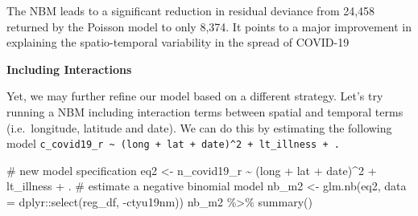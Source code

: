 \documentclass[
  letterpaper,
  DIV=11,
  numbers=noendperiod,
  oneside]{scrreprt}
\newenvironment{Shaded}{\begin{snugshade}}{\end{snugshade}}
\newcommand{\AttributeTok}[1]{\textcolor[rgb]{0.40,0.45,0.13}{#1}}
\newcommand{\CommentTok}[1]{\textcolor[rgb]{0.37,0.37,0.37}{#1}}
\newcommand{\DecValTok}[1]{\textcolor[rgb]{0.68,0.00,0.00}{#1}}
\newcommand{\FunctionTok}[1]{\textcolor[rgb]{0.28,0.35,0.67}{#1}}
\newcommand{\NormalTok}[1]{\textcolor[rgb]{0.00,0.23,0.31}{#1}}
\newcommand{\OtherTok}[1]{\textcolor[rgb]{0.00,0.23,0.31}{#1}}
\newcommand{\SpecialCharTok}[1]{\textcolor[rgb]{0.37,0.37,0.37}{#1}}
\begin{document}
The NBM leads to a significant reduction in residual deviance from
24,458 returned by the Poisson model to only 8,374. It points to a major
improvement in explaining the spatio-temporal variability in the spread
of COVID-19

\textbf{Including Interactions}

Yet, we may further refine our model based on a different strategy.
Let's try running a NBM including interaction terms between spatial and
temporal terms (i.e.~longitude, latitude and date). We can do this by
estimating the following model
\texttt{c\_covid19\_r\ \textasciitilde{}\ (long\ +\ lat\ +\ date)\^{}2\ +\ lt\_illness\ +\ .}

\begin{Shaded}
\begin{Highlighting}[]
\CommentTok{\# new model specification}
\NormalTok{eq2 }\OtherTok{\textless{}{-}}\NormalTok{ n\_covid19\_r }\SpecialCharTok{\textasciitilde{}}\NormalTok{ (long }\SpecialCharTok{+}\NormalTok{ lat }\SpecialCharTok{+}\NormalTok{ date)}\SpecialCharTok{\^{}}\DecValTok{2} \SpecialCharTok{+}\NormalTok{ lt\_illness }\SpecialCharTok{+}\NormalTok{ .}
\CommentTok{\# estimate a negative binomial model}
\NormalTok{nb\_m2 }\OtherTok{\textless{}{-}} \FunctionTok{glm.nb}\NormalTok{(eq2, }
       \AttributeTok{data =}\NormalTok{ dplyr}\SpecialCharTok{::}\FunctionTok{select}\NormalTok{(reg\_df, }\SpecialCharTok{{-}}\NormalTok{ctyu19nm))}
\NormalTok{nb\_m2 }\SpecialCharTok{\%\textgreater{}\%} \FunctionTok{summary}\NormalTok{()}
\end{Highlighting}
\end{Shaded}
\end{document}
